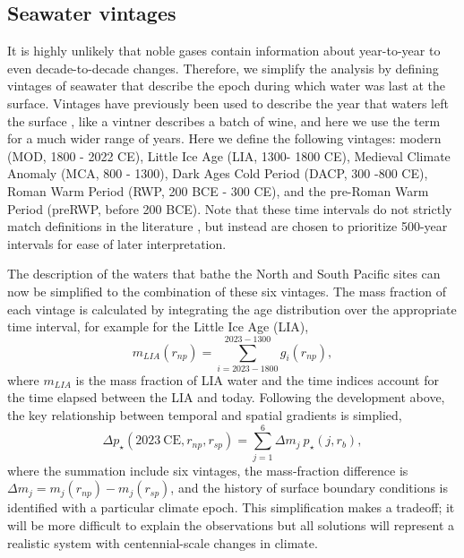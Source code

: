 \documentclass[12pt]{article}
\begin{document}
\subsection{Seawater vintages}

It is highly unlikely that noble gases contain information about
year-to-year to even decade-to-decade changes. Therefore, we simplify
the analysis by defining vintages of seawater that describe the epoch
during which water was last at the surface. Vintages have previously
been used to describe the year that waters left the surface
\cite{Pickart2002}, like a vintner describes a batch of wine, and here
we use the term for a much wider range of years. Here we define the
following vintages: modern (MOD, 1800 - 2022 CE), Little Ice Age (LIA,
1300- 1800 CE), Medieval Climate Anomaly (MCA, 800 - 1300), Dark Ages
Cold Period (DACP, 300 -800 CE), Roman Warm Period (RWP, 200 BCE - 300
CE), and the pre-Roman Warm Period (preRWP, before 200 BCE). Note that
these time intervals do not strictly match definitions in the
literature \cite{Paasche-Bakke-2010:Defining}, but instead are chosen
to prioritize 500-year intervals for ease of later interpretation.

The description of the waters that bathe the North and South Pacific
sites can now be simplified to the combination of these six vintages. The mass fraction of each vintage is calculated by integrating the age distribution over the appropriate time interval, for example for the Little Ice Age (LIA),
\begin{equation}
\label{eq:3}
m_{LIA}(r_{np}) = \sum_{i=2023-1800}^{2023-1300} g_i(r_{np}),
\end{equation}
where $m_{LIA}$ is the mass fraction of LIA water and the time indices
account for the time elapsed between the LIA and today.  Following the
development above, the key relationship between temporal and spatial
gradients is simplied,
\begin{equation}
\label{eq:3}
{\Delta}p_{\star}(2023~ \mathrm{CE}, r_{np}, r_{sp}) = \sum_{j=1}^{6} {\Delta}m_j~  p_{\star}(j, r_{b}),
\end{equation}
where the summation include six vintages, the mass-fraction difference
is ${\Delta}m_j = m_{j}(r_{np}) - m_{j}(r_{sp})$, and the history of
surface boundary conditions is identified with a particular climate
epoch. This simplification makes a tradeoff; it will be more difficult
to explain the observations but all solutions will represent a
realistic system with centennial-scale changes in climate.
\end{document}
